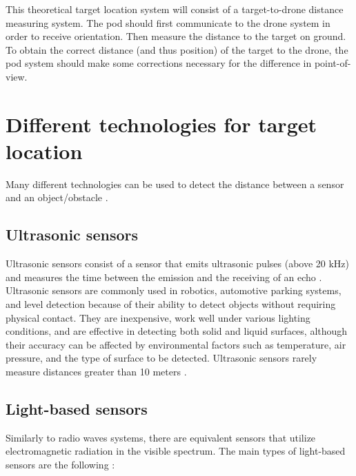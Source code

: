 This theoretical target location system will consist of a target-to-drone distance measuring system.
The pod should first communicate to the drone system in order to receive orientation. Then measure the
distance to the target on ground. To obtain the correct distance (and thus position) of the target to
the drone, the pod system should make some corrections necessary for the difference in point-of-view.


\section{Different technologies for target location}

Many different technologies can be used to detect the distance between a sensor and an object/obstacle
\cite{robotsens}.

\subsection{Ultrasonic sensors}

Ultrasonic sensors consist of a sensor that emits ultrasonic pulses (above 20 kHz)
and measures the time between the emission and the receiving of an echo \cite{ultrasound1}.
Ultrasonic sensors are commonly used in robotics, automotive parking systems, and level detection
because of their ability to detect objects without requiring physical contact. They are inexpensive,
work well under various lighting conditions, and are effective in detecting both solid and liquid
surfaces, although their accuracy can be affected by environmental factors such as temperature,
air pressure, and the type of surface to be detected. Ultrasonic sensors rarely measure distances
greater than 10 meters \cite{ultrasound2}.

\subsection{Light-based sensors}

Similarly to radio waves systems, there are equivalent sensors that utilize electromagnetic radiation
in the visible spectrum. The main types of light-based sensors are the following
 \cite{infrared}\cite{laserrangefinder}:

